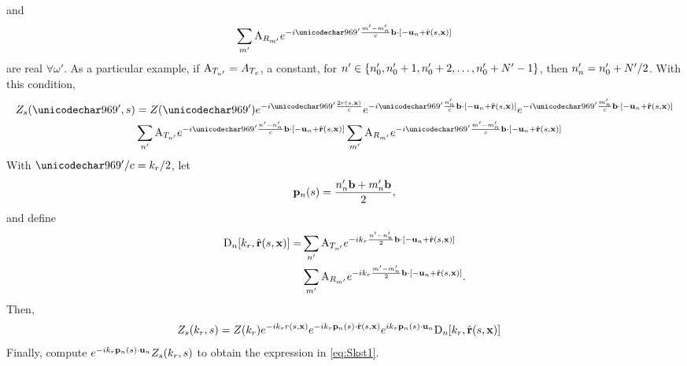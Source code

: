  and
 \begin{equation}
  \sum_{\txm}\rxAmp{\txm}\eex{-\im\omega'\frac{\txm-\txm_\channelIndex}{c}\bline\cdot[-\uzero+\uRangeVectorParm]}
 \end{equation}
 are real $\forall\omega'$. As a particular example, if $\text{A}_{T_{n'}}=A_{T_x}$, a constant, for $n'\in\{n'_0, n'_0+1, n'_0+2, \ldots, n'_0+N'-1\}$, then $n'_{n}=n'_0+N'/2$. With this condition,
 \begin{equation}
 \begin{split}
  \Pulse_{s}(\omega', \parm)&=\Pulse(\omega')\eex{-\im\omega'\frac{2\amplitude\range(\parm, \targetnoparm)}{c}}\eex{-\im\omega'\frac{\txn_\channelIndex}{c}\bline\cdot[-\uzero+\uRangeVectorParm]}\eex{-\im\omega'\frac{\txm_\channelIndex}{c}\bline\cdot[-\uzero+\uRangeVectorParm]}\\&\sum_{\txn}\txAmp{\txn}\eex{-\im\omega'\frac{\txn-\txn_\channelIndex}{c}\bline\cdot[-\uzero+\uRangeVectorParm]}
  \sum_{\txm}\rxAmp{\txm}\eex{-\im\omega'\frac{\txm-\txm_\channelIndex}{c}\bline\cdot[-\uzero+\uRangeVectorParm]}
 \end{split}
 \end{equation}
With $\omega'/c=\kr/2$, let
 \begin{equation}
  \mathbf{p}_{n}(s) = \frac{n'_{n}\mathbf{b} + m'_{n}\mathbf{b}}{2},
 \end{equation}
 and define
 \begin{equation}
 \begin{split}
  \text{D}_{n}[k_r, \hat{\mathbf{r}}(s, \mathbf{\mathbf{x}})] = 
  &\sum_{n'}\text{A}_{T_{n'}}e^{-ik_r\frac{n'-n'_{n}}{2}\mathbf{b}\cdot[-\mathbf{u}_{n}+\hat{\mathbf{r}}(s, \mathbf{\mathbf{x}})]}\\&
  \sum_{m'}\text{A}_{R_{m'}}e^{-ik_r\frac{m'-m'_{n}}{2}\mathbf{b}\cdot[-\mathbf{u}_{n}+\hat{\mathbf{r}}(s, \mathbf{\mathbf{x}})]}.
  \end{split}
 \end{equation}
 Then,
 \begin{equation}
 \begin{split}
  Z_{s}(k_r, s)&=Z(k_r)e^{-ik_r\mathnormal{r}(s, \mathbf{\mathbf{x}})}e^{-ik_r\mathbf{p}_{n}(s)\cdot\hat{\mathbf{r}}(s, \mathbf{\mathbf{x}})}e^{ik_r\mathbf{p}_{n}(s)\cdot\mathbf{u}_{n}}\text{D}_{n}[k_r, \hat{\mathbf{r}}(s, \mathbf{\mathbf{x}})]
 \end{split}
 \end{equation}
Finally, compute $e^{-ik_r\mathbf{p}_{n}(s)\cdot\mathbf{u}_{n}}Z_{s}(k_r, s)$ to obtain the expression in \eqref{eq:Skst1}.
